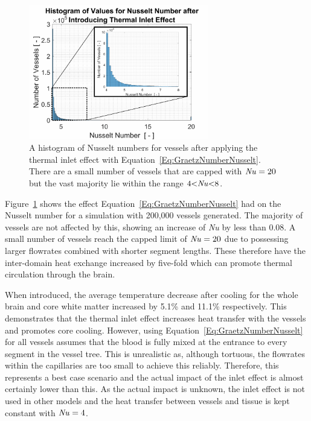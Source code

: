 \documentclass[11pt,english,a4paper,twoside,openright]{report}
\newcommand\Nuss{\mbox{\textit{Nu}}}
\begin{document}
{{{{{{{{\begin{figure}[h]
	\centering
	\includegraphics[width=0.7\textwidth]{Chapter3/Chapter3_GraetzHistogram}
	\caption[A histogram of Nusselt numbers for vessels after applying the thermal inlet effect]{A histogram of Nusselt numbers for vessels after applying the thermal inlet effect with Equation~\ref{Eq:GraetzNumberNusselt}. There are a small number of vessels that are capped with $\Nuss=20$ but the vast majority lie within the range $4{<}\Nuss{<}8$.}
	\label{fig:GraetzHistogram}
\end{figure}  

Figure~\ref{fig:GraetzHistogram} shows the effect Equation~\ref{Eq:GraetzNumberNusselt} had on the Nusselt number for a simulation with 200,000 vessels generated. The majority of vessels are not affected by this, showing an increase of {\Nuss} by less than 0.08. A small number of vessels reach the capped limit of $\Nuss=20$ due to possessing larger flowrates combined with shorter segment lengths. These therefore have the inter-domain heat exchange increased by five-fold which can promote thermal circulation through the brain. 

When introduced, the average temperature decrease after cooling for the whole brain and core white matter increased by 5.1\% and 11.1\% respectively. This demonstrates that the thermal inlet effect increases heat transfer with the vessels and promotes core cooling. However, using Equation~\ref{Eq:GraetzNumberNusselt} for all vessels assumes that the blood is fully mixed at the entrance to every segment in the vessel tree. This is unrealistic as, although tortuous, the flowrates within the capillaries are too small to achieve this reliably. Therefore, this represents a best case scenario and the actual impact of the inlet effect is almost certainly lower than this. As the actual impact is unknown, the inlet effect is not used in other models and the heat transfer between vessels and tissue is kept constant with $\Nuss=4$.

}}}}}}}}
\end{document}
